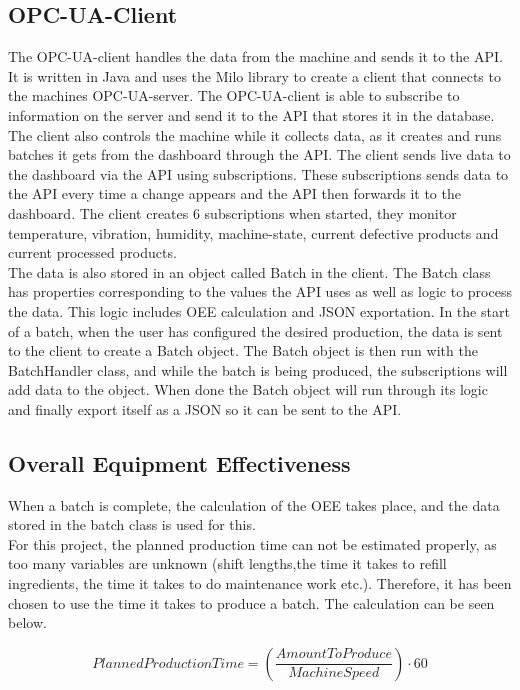 \subsection{OPC-UA-Client}
The OPC-UA-client handles the data from the machine and sends it to the API. It 
is written in Java and uses the Milo library to create a client that connects to 
the machines OPC-UA-server. The OPC-UA-client is able to subscribe to 
information on the server and send it to the API that stores it in the database.
The client also controls the machine while it collects data, as it creates and
runs batches it gets from the dashboard through the API. The client sends live
data to the dashboard via the API using subscriptions. These subscriptions sends
data to the API every time a change appears and the API then forwards it to the
dashboard. The client creates 6 subscriptions when started, they monitor
temperature, vibration, humidity, machine-state,  current defective products and
current processed products. \\

The data is also stored in an object called Batch in the client. The Batch class
has properties corresponding to the values the API uses as well as logic to
process the data. This logic includes OEE calculation and JSON exportation. In
the start of a batch, when the user has configured the desired production, the
data is sent to the client to create a Batch object. The Batch object is then
run with the BatchHandler class, and while the batch is being produced, the
subscriptions will add data to the object. When done the Batch object will run
through its logic and finally export itself as a JSON so it can be sent to the
API. 


\subsection{Overall Equipment Effectiveness}
When a batch is complete, the calculation of the OEE takes place, and the data
stored in the batch class is used for this.\\

For this project, the planned production time can not be estimated properly, as
too many variables are unknown (shift lengths,the time it takes to refill
ingredients, the time it takes to do maintenance work etc.). Therefore, it has
been chosen to use the time it takes to produce a batch. The calculation can be
seen below.

\[PlannedProductionTime = \left(\frac{AmountToProduce}{MachineSpeed}\right)\cdot60\]\\

